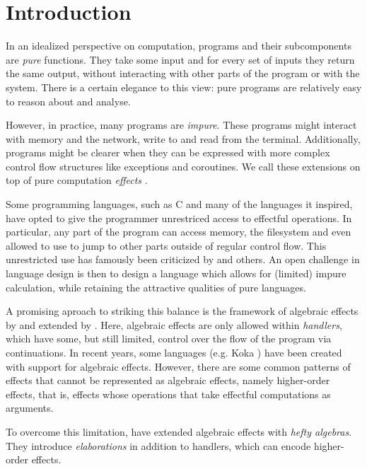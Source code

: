 \chapter{Introduction}\label{chap:introduction}

In an idealized perspective on computation, programs and their subcomponents are \emph{pure} functions. They take some input and for every set of inputs they return the same output, without interacting with other parts of the program or with the system. There is a certain elegance to this view: pure programs are relatively easy to reason about and analyse.

However, in practice, many programs are \emph{impure}. These programs might interact with memory and the network, write to and read from the terminal. Additionally, programs might be clearer when they can be expressed with more complex control flow structures like exceptions and coroutines. We call these extensions on top of pure computation \emph{effects} \autocite{moggi_computational_1989}.

Some programming languages, such as C and many of the languages it inspired, have opted to give the programmer unrestriced access to effectful operations. In particular, any part of the program can access memory, the filesystem and even allowed to use  to jump to other parts outside of regular control flow. This unrestricted use has famously been criticized by \textcite{dijkstra_letters_1968} and others. An open challenge in language design is then to design a language which allows for (limited) impure calculation, while retaining the attractive qualities of pure languages.

A promising aproach to striking this balance is the framework of algebraic effects by \textcite{goos_adequacy_2001} and extended by \textcite{castagna_handlers_2009}. Here, algebraic effects are only allowed within \emph{handlers}, which have some, but still limited, control over the flow of the program via continuations. In recent years, some languages (e.g. Koka \autocite{leijen_type_2017}) have been created with support for algebraic effects. However, there are some common patterns of effects that cannot be represented as algebraic effects, namely higher-order effects, that is, effects whose operations that take effectful computations as arguments.

To overcome this limitation, \textcite{bach_poulsen_hefty_2023} have extended algebraic effects with \emph{hefty algebras}. They introduce \emph{elaborations} in addition to handlers, which can encode higher-order effects.

